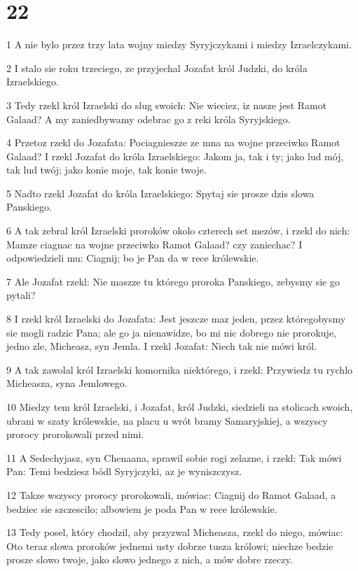 \chapter{22}

\par 1 A nie bylo przez trzy lata wojny miedzy Syryjczykami i miedzy Izraelczykami.
\par 2 I stalo sie roku trzeciego, ze przyjechal Jozafat król Judzki, do króla Izraelskiego.
\par 3 Tedy rzekl król Izraelski do slug swoich: Nie wieciez, iz nasze jest Ramot Galaad? A my zaniedbywamy odebrac go z reki króla Syryjskiego.
\par 4 Przetoz rzekl do Jozafata: Pociagnieszze ze mna na wojne przeciwko Ramot Galaad? I rzekl Jozafat do króla Izraelskiego: Jakom ja, tak i ty; jako lud mój, tak lud twój; jako konie moje, tak konie twoje.
\par 5 Nadto rzekl Jozafat do króla Izraelskiego: Spytaj sie prosze dzis slowa Panskiego.
\par 6 A tak zebral król Izraelski proroków okolo czterech set mezów, i rzekl do nich: Mamze ciagnac na wojne przeciwko Ramot Galaad? czy zaniechac? I odpowiedzieli mu: Ciagnij; bo je Pan da w rece królewskie.
\par 7 Ale Jozafat rzekl: Nie maszze tu którego proroka Panskiego, zebysmy sie go pytali?
\par 8 I rzekl król Izraelski do Jozafata: Jest jeszcze maz jeden, przez któregobysmy sie mogli radzic Pana; ale go ja nienawidze, bo mi nic dobrego nie prorokuje, jedno zle, Micheasz, syn Jemla. I rzekl Jozafat: Niech tak nie mówi król.
\par 9 A tak zawolal król Izraelski komornika niektórego, i rzekl: Przywiedz tu rychlo Micheasza, syna Jemlowego.
\par 10 Miedzy tem król Izraelski, i Jozafat, król Judzki, siedzieli na stolicach swoich, ubrani w szaty królewskie, na placu u wrót bramy Samaryjskiej, a wszyscy prorocy prorokowali przed nimi.
\par 11 A Sedechyjasz, syn Chenaana, sprawil sobie rogi zelazne, i rzekl: Tak mówi Pan: Temi bedziesz bódl Syryjczyki, az je wyniszczysz.
\par 12 Takze wszyscy prorocy prorokowali, mówiac: Ciagnij do Ramot Galaad, a bedziec sie szczescilo; albowiem je poda Pan w rece królewskie.
\par 13 Tedy posel, który chodzil, aby przyzwal Micheasza, rzekl do niego, mówiac: Oto teraz slowa proroków jednemi usty dobrze tusza królowi; niechze bedzie prosze slowo twoje, jako slowo jednego z nich, a mów dobre rzeczy.
